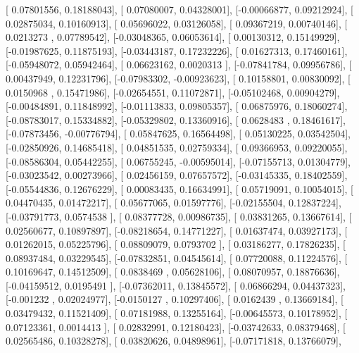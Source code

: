 \documentclass{article}
\begin{document}
       [ 0.07801556,  0.18188043],
       [ 0.07080007,  0.04328001],
       [-0.00066877,  0.09212924],
       [ 0.02875034,  0.10160913],
       [ 0.05696022,  0.03126058],
       [ 0.09367219,  0.00740146],
       [ 0.0213273 ,  0.07789542],
       [-0.03048365,  0.06053614],
       [ 0.00130312,  0.15149929],
       [-0.01987625,  0.11875193],
       [-0.03443187,  0.17232226],
       [ 0.01627313,  0.17460161],
       [-0.05948072,  0.05942464],
       [ 0.06623162,  0.0020313 ],
       [-0.07841784,  0.09956786],
       [ 0.00437949,  0.12231796],
       [-0.07983302, -0.00923623],
       [ 0.10158801,  0.00830092],
       [ 0.0150968 ,  0.15471986],
       [-0.02654551,  0.11072871],
       [-0.05102468,  0.00904279],
       [-0.00484891,  0.11848992],
       [-0.01113833,  0.09805357],
       [ 0.06875976,  0.18060274],
       [-0.08783017,  0.15334882],
       [-0.05329802,  0.13360916],
       [ 0.0628483 ,  0.18461617],
       [-0.07873456, -0.00776794],
       [ 0.05847625,  0.16564498],
       [ 0.05130225,  0.03542504],
       [-0.02850926,  0.14685418],
       [ 0.04851535,  0.02759334],
       [ 0.09366953,  0.09220055],
       [-0.08586304,  0.05442255],
       [ 0.06755245, -0.00595014],
       [-0.07155713,  0.01304779],
       [-0.03023542,  0.00273966],
       [ 0.02456159,  0.07657572],
       [-0.03145335,  0.18402559],
       [-0.05544836,  0.12676229],
       [ 0.00083435,  0.16634991],
       [ 0.05719091,  0.10054015],
       [ 0.04470435,  0.01472217],
       [ 0.05677065,  0.01597776],
       [-0.02155504,  0.12837224],
       [-0.03791773,  0.0574538 ],
       [ 0.08377728,  0.00986735],
       [ 0.03831265,  0.13667614],
       [ 0.02560677,  0.10897897],
       [-0.08218654,  0.14771227],
       [ 0.01637474,  0.03927173],
       [ 0.01262015,  0.05225796],
       [ 0.08809079,  0.0793702 ],
       [ 0.03186277,  0.17826235],
       [ 0.08937484,  0.03229545],
       [-0.07832851,  0.04545614],
       [ 0.07720088,  0.11224576],
       [ 0.10169647,  0.14512509],
       [ 0.0838469 ,  0.05628106],
       [ 0.08070957,  0.18876636],
       [-0.04159512,  0.0195491 ],
       [-0.07362011,  0.13845572],
       [ 0.06866294,  0.04437323],
       [-0.001232  ,  0.02024977],
       [-0.0150127 ,  0.10297406],
       [ 0.0162439 ,  0.13669184],
       [ 0.03479432,  0.11521409],
       [ 0.07181988,  0.13255164],
       [-0.00645573,  0.10178952],
       [ 0.07123361,  0.0014413 ],
       [ 0.02832991,  0.12180423],
       [-0.03742633,  0.08379468],
       [ 0.02565486,  0.10328278],
       [ 0.03820626,  0.04898961],
       [-0.07171818,  0.13766079],
\end{document}
